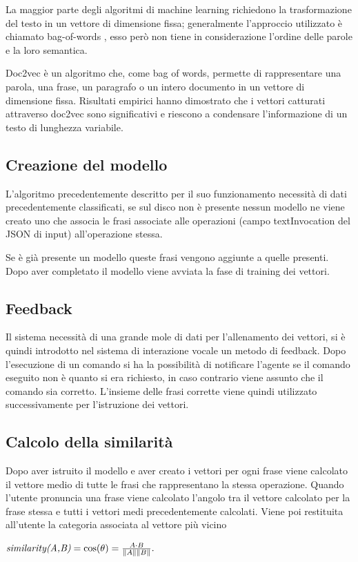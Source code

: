 \documentclass[twoside]{supsistudent}
\begin{document}
La maggior parte degli algoritmi di machine learning richiedono la trasformazione del testo in un vettore di dimensione fissa; generalmente l'approccio utilizzato è chiamato bag-of-words , esso però non tiene in considerazione l'ordine delle parole e la loro semantica.\cite{bow}

Doc2vec è un algoritmo che, come bag of words, permette di  rappresentare una parola, una frase, un paragrafo o un intero documento in un vettore di dimensione fissa. Risultati empirici hanno dimostrato che i vettori catturati attraverso doc2vec sono significativi e riescono a condensare l'informazione di un testo di lunghezza variabile.\cite{doc2vec}
\subsection{Creazione del modello}
L'algoritmo precedentemente descritto per il suo funzionamento necessità di dati precedentemente classificati, se sul disco non è presente nessun modello ne viene creato uno che associa le frasi associate alle operazioni (campo textInvocation del JSON di input) all'operazione stessa. 

Se è già presente un modello queste frasi vengono aggiunte a quelle presenti. Dopo aver completato il modello viene avviata la fase di training dei vettori.
\subsection{Feedback}
Il sistema necessità di una grande mole di dati per l'allenamento dei vettori, si è quindi introdotto nel sistema di interazione vocale un metodo di feedback. Dopo l'esecuzione di un comando si ha la possibilità di notificare l'agente se il comando eseguito non è quanto si era richiesto, in caso contrario viene assunto che il comando sia corretto. L'insieme delle frasi corrette viene quindi utilizzato successivamente per l'istruzione dei vettori.
\subsection{Calcolo della similarità}
Dopo aver istruito il modello e aver creato i vettori per ogni frase viene calcolato il vettore medio di tutte le frasi che rappresentano la stessa operazione. Quando l'utente pronuncia una frase viene calcolato l'angolo tra il vettore calcolato per la frase stessa e tutti i vettori medi precedentemente calcolati. Viene poi restituita all'utente la categoria associata al vettore più vicino
\begin{center}
\begin{math}
 \textit{similarity(A,B)} = \cos(\theta) = {A \cdot B \over \|A\| \|B\|}.
 \end{math}
 \end{center}
\end{document}
